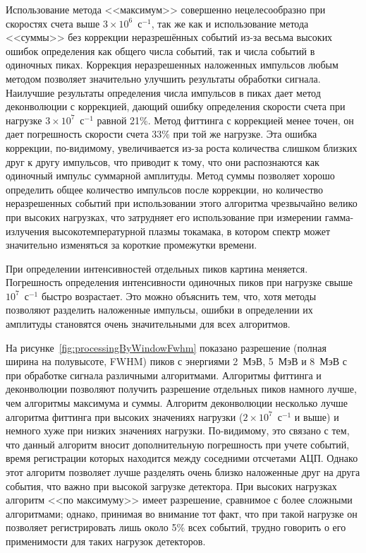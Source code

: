 Использование метода <<максимум>> совершенно нецелесообразно при скоростях счета выше $3 \times 10^6$~с${}^{-1}$, так же как и использование метода <<суммы>> без коррекции неразрешённых событий из-за весьма высоких ошибок определения как общего числа событий, так и числа событий в одиночных пиках. Коррекция неразрешенных наложенных импульсов любым методом позволяет значительно улучшить результаты обработки сигнала. Наилучшие результаты определения числа импульсов в пиках дает метод деконволюции с коррекцией, дающий ошибку определения скорости счета при нагрузке $3 \times 10^7$~с${}^{-1}$ равной 21\%. Метод фиттинга с коррекцией менее точен, он дает погрешность скорости счета 33\% при той же нагрузке. Эта ошибка коррекции, по-видимому, увеличивается из-за роста количества слишком близких друг к другу импульсов, что приводит к тому, что они распознаются как одиночный импульс суммарной амплитуды. Метод суммы позволяет хорошо определить общее количество импульсов после коррекции, но количество неразрешенных событий при использовании этого алгоритма чрезвычайно велико при высоких нагрузках, что затрудняет его использование при измерении гамма-излучения высокотемпературной плазмы токамака, в котором спектр может значительно изменяться за короткие промежутки времени.

При определении интенсивностей отдельных пиков картина меняется. Погрешность определения интенсивности одиночных пиков при нагрузке свыше $10^7$~с${}^{-1}$ быстро возрастает. Это можно объяснить тем, что, хотя методы позволяют разделить наложенные импульсы, ошибки в определении их амплитуды становятся очень значительными для всех алгоритмов.

На рисунке~\ref{fig:processingByWindowFwhm} показано разрешение (полная ширина на полувысоте, FWHM) пиков с энергиями 2~МэВ, 5~МэВ и 8~МэВ с при обработке сигнала различными алгоритмами. Алгоритмы фиттинга и деконволюции позволяют получить разрешение отдельных пиков намного лучше, чем алгоритмы максимума и суммы. Алгоритм деконволюции несколько лучше алгоритма фиттинга при высоких значениях нагрузки ($2 \times 10^7$~с${}^{-1}$ и выше) и немного хуже при низких значениях нагрузки. По-видимому, это связано с тем, что данный алгоритм вносит дополнительную погрешность при учете событий, время регистрации которых находится между соседними отсчетами АЦП. Однако этот алгоритм позволяет лучше разделять очень близко наложенные друг на друга события, что важно при высокой загрузке детектора. При высоких нагрузках  алгоритм <<по максимуму>> имеет разрешение, сравнимое с более сложными алгоритмами; однако, принимая во внимание тот факт, что при такой нагрузке он позволяет регистрировать лишь около 5\% всех событий, трудно говорить о его применимости для таких нагрузок детекторов.

